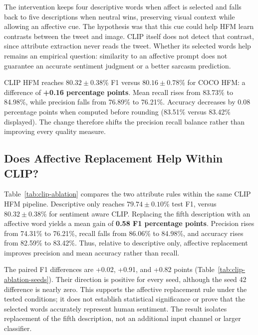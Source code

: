 \documentclass[conference]{IEEEtran}
\begin{document}
The intervention keeps four descriptive words when affect is selected and falls back to five descriptions when neutral wins, preserving visual context while allowing an affective cue. The hypothesis was that this cue could help HFM learn contrasts between the tweet and image. CLIP itself does not detect that contrast, since attribute extraction never reads the tweet. Whether its selected words help remains an empirical question: similarity to an affective prompt does not guarantee an accurate sentiment judgment or a better sarcasm prediction.

CLIP HFM reaches $80.32\pm0.38$\% F1 versus $80.16\pm0.78$\% for COCO HFM: a difference of \textbf{+0.16 percentage points}. Mean recall rises from 83.73\% to 84.98\%, while precision falls from 76.89\% to 76.21\%. Accuracy decreases by 0.08 percentage points when computed before rounding (83.51\% versus 83.42\% displayed). The change therefore shifts the precision recall balance rather than improving every quality measure.

\subsection{Does Affective Replacement Help Within CLIP?}
Table~\ref{tab:clip-ablation} compares the two attribute rules within the same CLIP HFM pipeline. Descriptive only reaches $79.74\pm0.10$\% test F1, versus $80.32\pm0.38$\% for sentiment aware CLIP. Replacing the fifth description with an affective word yields a mean gain of \textbf{0.58 F1 percentage points}. Precision rises from 74.31\% to 76.21\%, recall falls from 86.06\% to 84.98\%, and accuracy rises from 82.59\% to 83.42\%. Thus, relative to descriptive only, affective replacement improves precision and mean accuracy rather than recall.

\begin{table}[t]
\caption{Matched CLIP attribute ablation: test metrics in percent, mean $\pm$ sample SD over seeds 42, 43, and 44. Both variants use the same expanded embeddings and HFM architecture.}
\label{tab:clip-ablation}
\centering\small

\end{table}

The paired F1 differences are +0.02, +0.91, and +0.82 points (Table~\ref{tab:clip-ablation-seeds}). Their direction is positive for every seed, although the seed 42 difference is nearly zero. This supports the affective replacement rule under the tested conditions; it does not establish statistical significance or prove that the selected words accurately represent human sentiment. The result isolates replacement of the fifth description, not an additional input channel or larger classifier.
\end{document}
